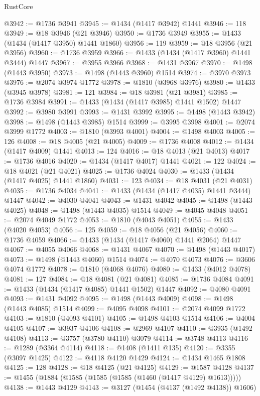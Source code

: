 \begin{lexlean}{RustCore}
\begin{coremodule}
@3942 := @1736 @3941
@3945 := @1434 (@1417 @3942) @1441
@3946 := 118
@3949 := @18 @3946 (@21 @3946)
@3950 := @1736 @3949
@3955 := @1433 (@1434 (@1417 @3950) @1441 @1860)
@3956 := 119
@3959 := @18 @3956 (@21 @3956)
@3960 := @1736 @3959
@3966 := @1433 (@1434 (@1417 @3960) @1441 @3444) @1447
@3967 := @3955 @3966
@3968 := @1431 @3967
@3970 := @1498 (@1443 @3950)
@3973 := @1498 (@1443 @3960) @1514
@3974 := @3970 @3973
@3976 := @2074 @3974 @1772
@3978 := @1810 (@3968 @3976)
@3980 := @1433 (@3945 @3978)
@3981 := 121
@3984 := @18 @3981 (@21 @3981)
@3985 := @1736 @3984
@3991 := @1433 (@1434 (@1417 @3985) @1441 @1502) @1447
@3992 := @3980 @3991
@3993 := @1431 @3992
@3995 := @1498 (@1443 @3942)
@3998 := @1498 (@1443 @3985) @1514
@3999 := @3995 @3998
@4001 := @2074 @3999 @1772
@4003 := @1810 (@3993 @4001)
@4004 := @1498 @4003
@4005 := 126
@4008 := @18 @4005 (@21 @4005)
@4009 := @1736 @4008
@4012 := @1434 (@1417 @4009) @1441
@4013 := 124
@4016 := @18 @4013 (@21 @4013)
@4017 := @1736 @4016
@4020 := @1434 (@1417 @4017) @1441
@4021 := 122
@4024 := @18 @4021 (@21 @4021)
@4025 := @1736 @4024
@4030 := @1433 (@1434 (@1417 @4025) @1441 @1860)
@4031 := 123
@4034 := @18 @4031 (@21 @4031)
@4035 := @1736 @4034
@4041 := @1433 (@1434 (@1417 @4035) @1441 @3444) @1447
@4042 := @4030 @4041
@4043 := @1431 @4042
@4045 := @1498 (@1443 @4025)
@4048 := @1498 (@1443 @4035) @1514
@4049 := @4045 @4048
@4051 := @2074 @4049 @1772
@4053 := @1810 (@4043 @4051)
@4055 := @1433 (@4020 @4053)
@4056 := 125
@4059 := @18 @4056 (@21 @4056)
@4060 := @1736 @4059
@4066 := @1433 (@1434 (@1417 @4060) @1441 @2064) @1447
@4067 := @4055 @4066
@4068 := @1431 @4067
@4070 := @1498 (@1443 @4017)
@4073 := @1498 (@1443 @4060) @1514
@4074 := @4070 @4073
@4076 := @3606 @4074 @1772
@4078 := @1810 (@4068 @4076)
@4080 := @1433 (@4012 @4078)
@4081 := 127
@4084 := @18 @4081 (@21 @4081)
@4085 := @1736 @4084
@4091 := @1433 (@1434 (@1417 @4085) @1441 @1502) @1447
@4092 := @4080 @4091
@4093 := @1431 @4092
@4095 := @1498 (@1443 @4009)
@4098 := @1498 (@1443 @4085) @1514
@4099 := @4095 @4098
@4101 := @2074 @4099 @1772
@4103 := @1810 (@4093 @4101)
@4105 := @1498 @4103 @1514
@4106 := @4004 @4105
@4107 := @3937 @4106
@4108 := @2969 @4107
@4110 := @3935 (@1492 @4108)
@4113 := @3757 (@3780 @4110) @3079
@4114 := @3748 @4113
@4116 := @1289 (@3364 @4114)
@4118 := @1408 (@1411 @135)
@4120 := @3355 (@3097 @1425)
@4122 := @4118 @4120 @1429
@4124 := @1434 @1465 @1808
@4125 := 128
@4128 := @18 @4125 (@21 @4125)
@4129 := @1587 @4128
@4137 := @1455 (@1884 (@1585 (@1585 (@1585 (@1460 (@1417 @4129) @1613)))))
@4138 := @1443 @4129
@4143 := @3127 (@1454 (@4137 (@1492 @4138)) @1606)

\end{coremodule}
\end{lexlean}

